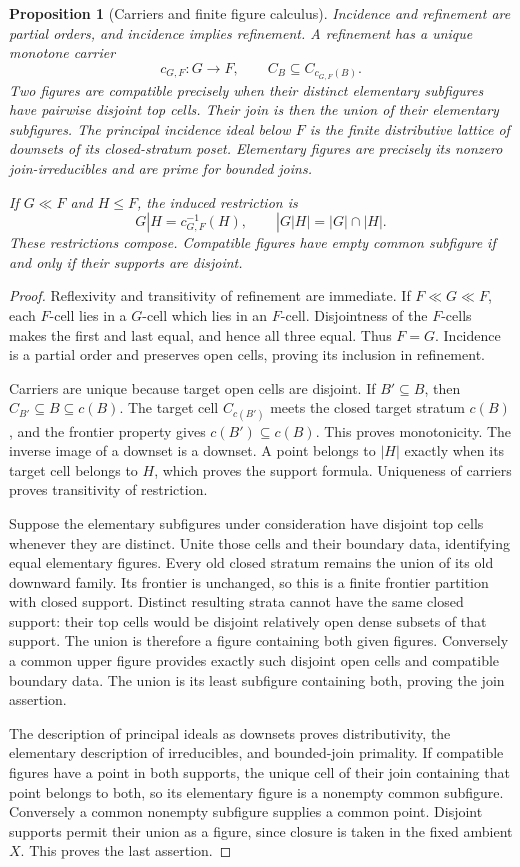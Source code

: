\documentclass[11pt,a4paper]{article}
\newtheorem{proposition}[theorem]{Proposition}
\theoremstyle{definition}
\begin{document}
\begin{proposition}[Carriers and finite figure calculus]\label{prop:cellcalculus}
Incidence and refinement are partial orders, and incidence implies refinement. A refinement has a unique monotone carrier
\[
 c_{G,F}:G\longrightarrow F,\qquad C_B\subseteq C_{c_{G,F}(B)}.
\]
Two figures are compatible precisely when their distinct elementary subfigures have pairwise disjoint top cells. Their join is then the union of their elementary subfigures. The principal incidence ideal below $F$ is the finite distributive lattice of downsets of its closed-stratum poset. Elementary figures are precisely its nonzero join-irreducibles and are prime for bounded joins.

If $G\ll F$ and $H\le F$, the induced restriction is
\[
 G|H=c_{G,F}^{-1}(H),\qquad |G|H|=|G|\cap|H|.
\]
These restrictions compose. Compatible figures have empty common subfigure if and only if their supports are disjoint.
\end{proposition}
\begin{proof}
Reflexivity and transitivity of refinement are immediate. If $F\ll G\ll F$, each $F$-cell lies in a $G$-cell which lies in an $F$-cell. Disjointness of the $F$-cells makes the first and last equal, and hence all three equal. Thus $F=G$. Incidence is a partial order and preserves open cells, proving its inclusion in refinement.

Carriers are unique because target open cells are disjoint. If $B'\subseteq B$, then $C_{B'}\subseteq B\subseteq c(B)$. The target cell $C_{c(B')}$ meets the closed target stratum $c(B)$, and the frontier property gives $c(B')\subseteq c(B)$. This proves monotonicity. The inverse image of a downset is a downset. A point belongs to $|H|$ exactly when its target cell belongs to $H$, which proves the support formula. Uniqueness of carriers proves transitivity of restriction.

Suppose the elementary subfigures under consideration have disjoint top cells whenever they are distinct. Unite those cells and their boundary data, identifying equal elementary figures. Every old closed stratum remains the union of its old downward family. Its frontier is unchanged, so this is a finite frontier partition with closed support. Distinct resulting strata cannot have the same closed support: their top cells would be disjoint relatively open dense subsets of that support. The union is therefore a figure containing both given figures. Conversely a common upper figure provides exactly such disjoint open cells and compatible boundary data. The union is its least subfigure containing both, proving the join assertion.

The description of principal ideals as downsets proves distributivity, the elementary description of irreducibles, and bounded-join primality. If compatible figures have a point in both supports, the unique cell of their join containing that point belongs to both, so its elementary figure is a nonempty common subfigure. Conversely a common nonempty subfigure supplies a common point. Disjoint supports permit their union as a figure, since closure is taken in the fixed ambient $X$. This proves the last assertion.
\end{proof}
\end{document}
